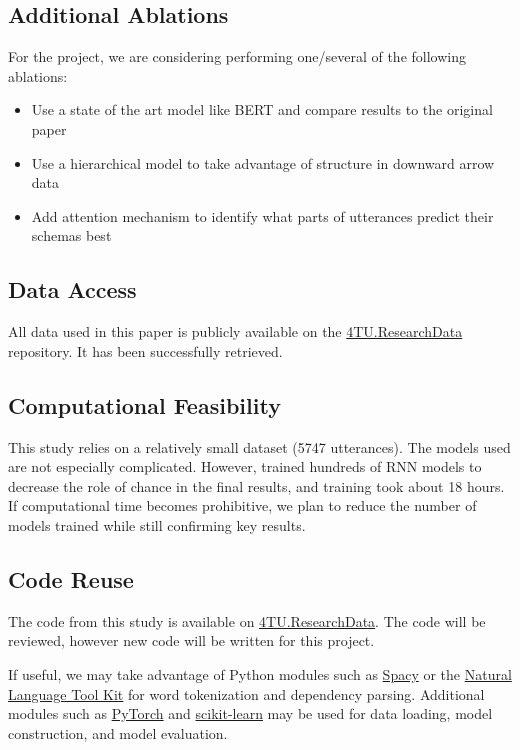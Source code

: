 \documentclass[11pt,a4paper]{article}
\begin{document}
\subsection{Additional Ablations}
For the project, we are considering performing one/several of the following ablations: 
\begin{itemize}
  \item Use a state of the art model like BERT and compare results to the original paper
  \item Use a hierarchical model to take advantage of structure in downward arrow data
  \item Add attention mechanism to identify what parts of utterances predict their schemas best
\end{itemize}

\subsection{Data Access}
All data used in this paper is publicly available on the \href{https://data.4tu.nl/info/en/about-4turesearchdata/organisation}{4TU.ResearchData} repository. It has been successfully retrieved. 

\subsection{Computational Feasibility}
This study relies on a relatively small dataset (5747 utterances). The models used are not especially complicated. However, \citet{burger_2021} trained hundreds of RNN models to decrease the role of chance in the final results, and training took about 18 hours. If computational time becomes prohibitive, we plan to reduce the number of models trained while still confirming key results. 

\subsection{Code Reuse}
The code from this study is available on \href{https://data.4tu.nl/info/en/about-4turesearchdata/organisation}{4TU.ResearchData}. The code will be reviewed, however new code will be written for this project. 

If useful, we may take advantage of Python modules such as \href{https://spacy.io/}{Spacy} or the \href{https://www.nltk.org/}{Natural Language Tool Kit} for word tokenization and dependency parsing. Additional modules such as \href{https://pytorch.org/}{PyTorch} and \href{https://scikit-learn.org/stable/}{scikit-learn} may be used for data loading, model construction, and model evaluation. 



\end{document}
